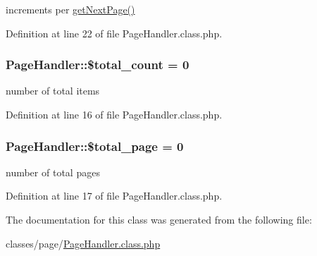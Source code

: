 increments per \hyperlink{classPageHandler_a259d01838d005d854d4cc263ba524de7}{get\-Next\-Page()} 



Definition at line 22 of file Page\-Handler.\-class.\-php.

\hypertarget{classPageHandler_ad0425a5e936db072a17956e4dada6f2b}{
\subsubsection[{\$total\-\_\-count}]{\setlength{\rightskip}{0pt plus 5cm}Page\-Handler\-::\$total\-\_\-count = 0}}\label{classPageHandler_ad0425a5e936db072a17956e4dada6f2b}


number of total items 



Definition at line 16 of file Page\-Handler.\-class.\-php.

\hypertarget{classPageHandler_adfb101b1d69a89c65cbe405e5d2be0ad}{
\subsubsection[{\$total\-\_\-page}]{\setlength{\rightskip}{0pt plus 5cm}Page\-Handler\-::\$total\-\_\-page = 0}}\label{classPageHandler_adfb101b1d69a89c65cbe405e5d2be0ad}


number of total pages 



Definition at line 17 of file Page\-Handler.\-class.\-php.



The documentation for this class was generated from the following file\-:\begin{DoxyCompactItemize}
\item 
classes/page/\hyperlink{PageHandler_8class_8php}{Page\-Handler.\-class.\-php}\end{DoxyCompactItemize}
